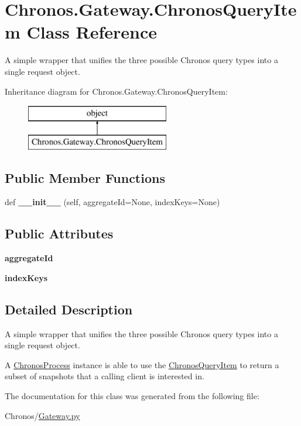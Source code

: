 \hypertarget{classChronos_1_1Gateway_1_1ChronosQueryItem}{}\section{Chronos.\+Gateway.\+Chronos\+Query\+Item Class Reference}
\label{classChronos_1_1Gateway_1_1ChronosQueryItem}


A simple wrapper that unifies the three possible Chronos query types into a single request object.  


Inheritance diagram for Chronos.\+Gateway.\+Chronos\+Query\+Item\+:\begin{figure}[H]
\begin{center}
\leavevmode
\includegraphics[height=2.000000cm]{classChronos_1_1Gateway_1_1ChronosQueryItem}
\end{center}
\end{figure}
\subsection*{Public Member Functions}
\begin{DoxyCompactItemize}
\item 
def {\bfseries \+\_\+\+\_\+init\+\_\+\+\_\+} (self, aggregate\+Id=None, index\+Keys=None)
\end{DoxyCompactItemize}
\subsection*{Public Attributes}
\begin{DoxyCompactItemize}
\item 
{\bfseries aggregate\+Id}
\item 
{\bfseries index\+Keys}
\end{DoxyCompactItemize}


\subsection{Detailed Description}
A simple wrapper that unifies the three possible Chronos query types into a single request object. 

A \hyperlink{classChronos_1_1Gateway_1_1ChronosProcess}{Chronos\+Process} instance is able to use the \hyperlink{classChronos_1_1Gateway_1_1ChronosQueryItem}{Chronos\+Query\+Item} to return a subset of snapshots that a calling client is interested in. 

The documentation for this class was generated from the following file\+:\begin{DoxyCompactItemize}
\item 
Chronos/\hyperlink{Gateway_8py}{Gateway.\+py}\end{DoxyCompactItemize}
